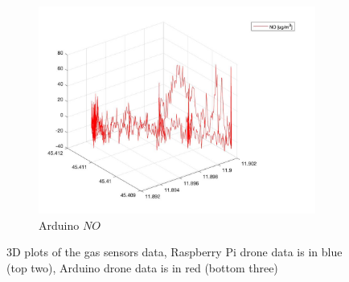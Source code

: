 \begin{figure}
    \begin{subfigure}[b]{0.45\textwidth}
        \centering
        \includegraphics[width=\textwidth]{images/flight-data/arduino/NO_3D.jpg}
        \caption{Arduino $NO$}
        \label{fig:NO_3D}
    \end{subfigure}
       \caption{3D plots of the gas sensors data, Raspberry Pi drone data is in blue (top two), Arduino drone data is in red (bottom three)}
       \label{fig:3Ds}
\end{figure}